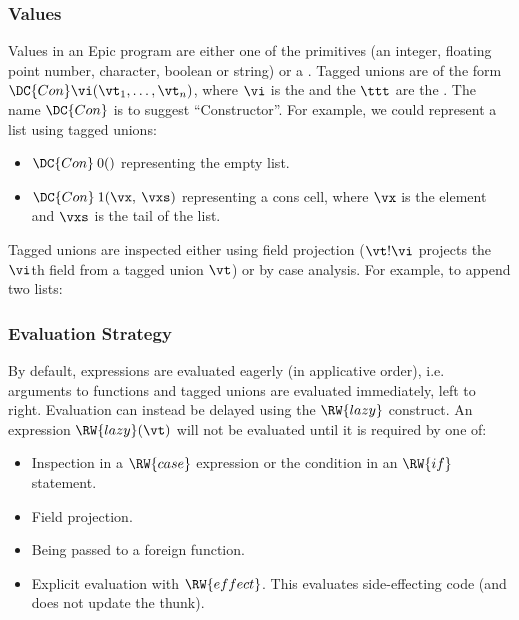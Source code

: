 \subsubsection*{Values}

Values in an Epic program are either one of the primitives (an
integer, floating point number, character, boolean or string) or a
. Tagged unions are of the form $\DC{Con}
\vi(\vt_1,\ldots,\vt_n)$, where $\vi$ is the  and the $\ttt$
are the . The name $\DC{Con}$ is to suggest
``Constructor''. For example, we could represent a list using tagged
unions:

\begin{itemize}
\item $\DC{Con}\:0()$ representing the empty list.
\item $\DC{Con}\:1(\vx,\:\vxs)$ representing a cons cell, where $\vx$
  is the element and $\vxs$ is the tail of the list.
\end{itemize}

Tagged unions are inspected either using field projection ($\vt!\vi$
projects the $\vi$th field from a tagged union $\vt$) or by case
analysis. For example, to append two lists:


\subsubsection*{Evaluation Strategy}

By default, expressions are evaluated eagerly (in applicative order),
i.e. arguments to functions and tagged unions are evaluated
immediately, left to right. Evaluation can instead be delayed using
the $\RW{lazy}$ construct. An expression $\RW{lazy}(\vt)$ will not be
evaluated until it is required by one of:

\begin{itemize}
\item Inspection in a $\RW{case}$ expression or the condition in an
  $\RW{if}$ statement.
\item Field projection.
\item Being passed to a foreign function.
\item Explicit evaluation with $\RW{effect}$. This evaluates
  side-effecting code (and does not update the thunk).
\end{itemize}

